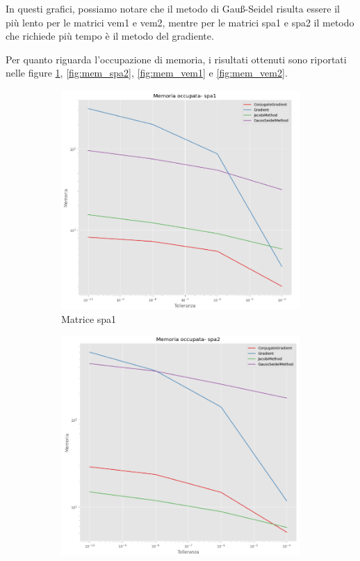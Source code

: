 In questi grafici, possiamo notare che il metodo di Gauß-Seidel risulta essere
il più lento per le matrici vem1 e vem2, mentre per le matrici spa1 e spa2
il metodo che richiede più tempo è il metodo del gradiente.

Per quanto riguarda l'occupazione di memoria, i risultati ottenuti sono riportati
nelle figure \ref{fig:mem_spa1}, \ref{fig:mem_spa2}, \ref{fig:mem_vem1} e \ref{fig:mem_vem2}.

\begin{figure}[!ht]
    \centering
    \begin{subfigure}{0.45\textwidth}
        \centering
        \includegraphics[width=\textwidth]{./img/mem_spa1.png}
        \caption{Matrice spa1}
        \label{fig:mem_spa1}
    \end{subfigure}
    \begin{subfigure}{0.45\textwidth}
        \centering
        \includegraphics[width=\textwidth]{./img/mem_spa2.png}

\end{subfigure}
\end{figure}
